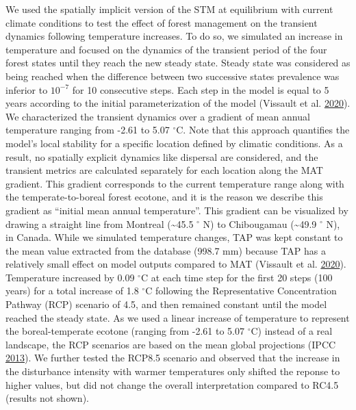 \documentclass[12pt]{article}
\begin{document}
We used the spatially implicit version of the STM at equilibrium with
current climate conditions to test the effect of forest management on
the transient dynamics following temperature increases. To do so, we
simulated an increase in temperature and focused on the dynamics of the
transient period of the four forest states until they reach the new
steady state. Steady state was considered as being reached when the
difference between two successive states prevalence was inferior to
\(10^{-7}\) for 10 consecutive steps. Each step in the model is equal to
5 years according to the initial parameterization of the model (Vissault
et al. \protect\hyperlink{ref-Vissault2020}{2020}). We characterized the
transient dynamics over a gradient of mean annual temperature ranging
from -2.61 to 5.07 \(^{\circ}\)C. Note that this approach quantifies the
model's local stability for a specific location defined by climatic
conditions. As a result, no spatially explicit dynamics like dispersal
are considered, and the transient metrics are calculated separately for
each location along the MAT gradient. This gradient corresponds to the
current temperature range along with the temperate-to-boreal forest
ecotone, and it is the reason we describe this gradient as ``initial
mean annual temperature''. This gradient can be visualized by drawing a
straight line from Montreal (\textasciitilde45.5 \(^{\circ}\) N) to
Chibougamau (\textasciitilde49.9 \(^{\circ}\) N), in Canada. While we
simulated temperature changes, TAP was kept constant to the mean value
extracted from the database (998.7 mm) because TAP has a relatively
small effect on model outputs compared to MAT (Vissault et al.
\protect\hyperlink{ref-Vissault2020}{2020}). Temperature increased by
0.09 \(^{\circ}\)C at each time step for the first 20 steps (100 years)
for a total increase of 1.8 \(^{\circ}\)C following the Representative
Concentration Pathway (RCP) scenario of 4.5, and then remained constant
until the model reached the steady state. As we used a linear increase
of temperature to represent the boreal-temperate ecotone (ranging from
-2.61 to 5.07 \(^{\circ}\)C) instead of a real landscape, the RCP
scenarios are based on the mean global projections (IPCC
\protect\hyperlink{ref-IPCC2013}{2013}). We further tested the RCP8.5
scenario and observed that the increase in the disturbance intensity
with warmer temperatures only shifted the reponse to higher values, but
did not change the overall interpretation compared to RC4.5 (results not
shown).
\end{document}
